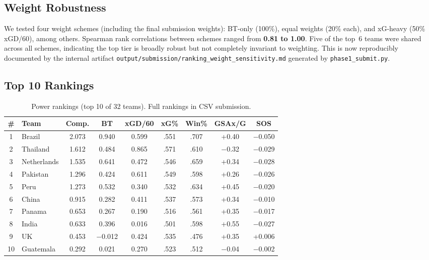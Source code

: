 \documentclass[11pt, a4paper]{article}
\begin{document}
\subsection{Weight Robustness}

We tested four weight schemes (including the final submission weights): BT-only (100\%), equal weights (20\% each), and xG-heavy (50\% xGD/60), among others. Spearman rank correlations between schemes ranged from \textbf{0.81 to 1.00}. Five of the top~6 teams were shared across all schemes, indicating the top tier is broadly robust but not completely invariant to weighting. This is now reproducibly documented by the internal artifact \texttt{output/submission/ranking\_weight\_sensitivity.md} generated by \texttt{phase1\_submit.py}.

\subsection{Top 10 Rankings}

\begin{table}[H]
\centering
\caption{Power rankings (top 10 of 32 teams). Full rankings in CSV submission.}
\label{tab:rankings}
\begin{tabular}{clccccccc}
\toprule
\textbf{\#} & \textbf{Team} & \textbf{Comp.} & \textbf{BT} & \textbf{xGD/60} & \textbf{xG\%} & \textbf{Win\%} & \textbf{GSAx/G} & \textbf{SOS} \\
\midrule
1  & Brazil      & 2.073 & 0.940 & 0.599 & .551 & .707 & +0.40 & $-$0.050 \\
2  & Thailand    & 1.612 & 0.484 & 0.865 & .571 & .610 & $-$0.32 & $-$0.029 \\
3  & Netherlands & 1.535 & 0.641 & 0.472 & .546 & .659 & +0.34 & $-$0.028 \\
4  & Pakistan    & 1.296 & 0.424 & 0.611 & .549 & .598 & +0.26 & $-$0.026 \\
5  & Peru        & 1.273 & 0.532 & 0.340 & .532 & .634 & +0.45 & $-$0.020 \\
6  & China       & 0.915 & 0.282 & 0.411 & .537 & .573 & +0.34 & $-$0.010 \\
7  & Panama      & 0.653 & 0.267 & 0.190 & .516 & .561 & +0.35 & $-$0.017 \\
8  & India       & 0.633 & 0.396 & 0.016 & .501 & .598 & +0.55 & $-$0.027 \\
9  & UK          & 0.453 & $-$0.012 & 0.424 & .535 & .476 & +0.35 & +0.006 \\
10 & Guatemala   & 0.292 & 0.021 & 0.270 & .523 & .512 & $-$0.04 & $-$0.002 \\
\bottomrule
\end{tabular}
\end{table}
\end{document}
